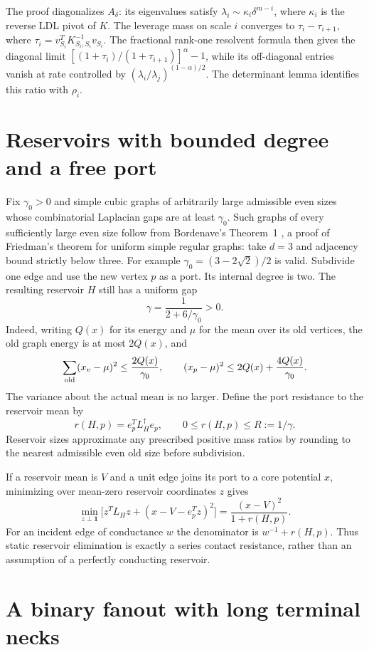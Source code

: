 \documentclass[11pt]{article}
\begin{document}
The proof diagonalizes $A_\delta$: its eigenvalues satisfy
$\lambda_i\sim\kappa_i\delta^{m-i}$, where $\kappa_i$ is the reverse
LDL pivot of $K$. The leverage mass on scale $i$ converges to
$\tau_i-\tau_{i+1}$, where
$\tau_i=v_{S_i}^TK_{S_i,S_i}^{-1}v_{S_i}$. The fractional rank-one
resolvent formula then gives the diagonal limit
$[(1+\tau_i)/(1+\tau_{i+1})]^\alpha-1$, while its off-diagonal entries
vanish at rate controlled by $(\lambda_i/\lambda_j)^{(1-\alpha)/2}$.
The determinant lemma identifies this ratio with $\rho_i$.

\section*{Reservoirs with bounded degree and a free port}

Fix $\gamma_0>0$ and simple cubic graphs of arbitrarily large admissible
even sizes whose combinatorial Laplacian gaps are at least $\gamma_0$.
Such graphs of every sufficiently large even size follow from
Bordenave's Theorem~1 \cite{Bordenave}, a proof of Friedman's theorem
for uniform simple regular graphs: take $d=3$ and adjacency bound
strictly below three. For example $\gamma_0=(3-2\sqrt2)/2$ is valid.
Subdivide one edge and use the new
vertex $p$ as a port. Its internal degree is two. The resulting
reservoir $H$ still has a uniform gap
\[
 \gamma=\frac1{2+6/\gamma_0}>0.
\]
Indeed, writing $Q(x)$ for its energy and $\mu$ for the mean over its
old vertices, the old graph energy is at most $2Q(x)$, and
\[
 \sum_{\rm old}(x_v-\mu)^2\le\frac{2Q(x)}{\gamma_0},\qquad
 (x_p-\mu)^2\le2Q(x)+\frac{4Q(x)}{\gamma_0}.
\]
The variance about the actual mean is no larger. Define the port
resistance to the reservoir mean by
\[
 r(H,p)=e_p^TL_H^\dagger e_p,\qquad 0\le r(H,p)\le R:=1/\gamma.
\]
Reservoir sizes approximate any prescribed positive mass ratios by
rounding to the nearest admissible even old size before subdivision.

If a reservoir mean is $V$ and a unit edge joins its port to a core
potential $x$, minimizing over mean-zero reservoir coordinates $z$ gives
\[
 \min_{z\perp\mathbf1}\bigl[z^TL_Hz+(x-V-e_p^Tz)^2\bigr]
             =\frac{(x-V)^2}{1+r(H,p)}.
\]
For an incident edge of conductance $w$ the denominator is
$w^{-1}+r(H,p)$. Thus static reservoir elimination is exactly a series
contact resistance, rather than an assumption of a perfectly
conducting reservoir.

\section*{A binary fanout with long terminal necks}
\end{document}

